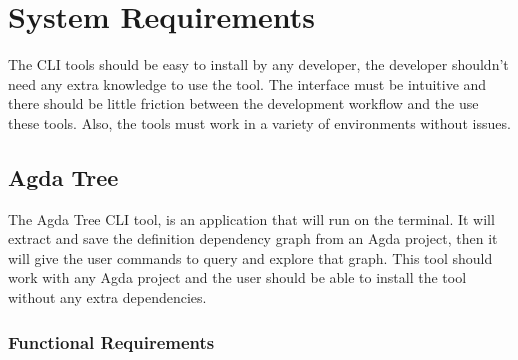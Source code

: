 
\chapter{System Requirements} \label{ch:system requirements}

The CLI tools should be easy to install by any developer, the developer
shouldn't need any extra knowledge to use the tool. The interface must be
intuitive and there should be little friction between the development workflow
and the use these tools. Also, the tools must work in a variety of environments
without issues.


\section{Agda Tree}

The Agda Tree CLI tool, is an application that will run on the terminal. It
will extract and save the definition dependency graph from an Agda project,
then it will give the user commands to query and explore that graph. This tool
should work with any Agda project and the user should be able to install the
tool without any extra dependencies.


\subsection{Functional Requirements}

